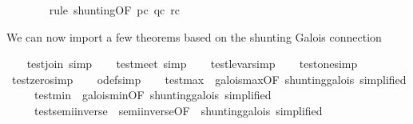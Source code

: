\begin{isabellebody}
\ \ \ \ \ \ \isamarkupfalse%
\ {}rule\ shunting{}OF\ pc\ qc\ rc{}{}\isanewline
\ \ \isamarkupfalse%
%
\endisatagproof
{\isafoldproof}%
%
\isadelimproof
%
\endisadelimproof
%
\begin{isamarkuptext}%
We can now import a few theorems based on the shunting
  Galois connection%
\end{isamarkuptext}%
\isamarkuptrue%
\ \ \isamarkupfalse%
\ test{}join\ {}simp{}\isanewline
\ \ \isamarkupfalse%
\ test{}meet\ {}simp{}\isanewline
\ \ \isamarkupfalse%
\ test{}le{}var{}simp{}\isanewline
\ \ \isamarkupfalse%
\ test{}one{}simp{}\isanewline
\ \ \isamarkupfalse%
\ test{}zero{}simp{}\isanewline
\ \ \isamarkupfalse%
\ o{}def{}simp{}\isanewline
\isanewline
\ \ \isamarkupfalse%
\ test{}max\ {}\ galois{}max{}OF\ shunting{}galois{}\ simplified{}\isanewline
\ \ \ \ \ test{}min\ {}\ galois{}min{}OF\ shunting{}galois{}\ simplified{}\isanewline
\ \ \ \ \ test{}semi{}inverse{}\ {}\ semi{}inverse{}{}OF\ {}\ shunting{}galois{}\ simplified{}\isanewline

\end{isabellebody}
